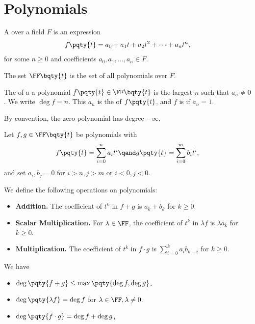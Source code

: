 \section{Polynomials}

\begin{definition}
    A  over a field \(F\) is an expression
    \[
        f\pqty{t} = a_0 + a_1 t + a_2 t^2 + \dots + a_n t^n,
    \]
    for some \(n \geq 0\) and coefficients \(a_0, a_1, \dots, a_n \in F\).

    The set \(\FF\bqty{t}\) is the set of all polynomials over \(F\).

    The  of a a polynomial \(f\pqty{t} \in \FF\bqty{t}\) is the largest \(n\) such that \(a_n \neq 0\). We write \(\deg f = n\). This \(a_n\) is the  of \(f\pqty{t}\), and \(f\) is  if \(a_n = 1\).

    By convention, the zero polynomial has degree \(-\infty\).
\end{definition}

\begin{definition}
    Let \(f, g \in \FF\bqty{t}\) be polynomials with
    \[
        f\pqty{t} = \sum_{i = 0}^{n} a_i t^i \qand g\pqty{t} = \sum_{ i =0}^{m} b_i t^i,
    \]
    and set \(a_i, b_j = 0\) for \(i > n, j > m\) or \(i < 0, j < 0\).
    
    We define the following operations on polynomials:
    \begin{itemize}
        \item \textbf{Addition.} The coefficient of \(t^k\) in \(f + g\) is \(a_k + b_k\) for \(k \geq 0\).
        \item \textbf{Scalar Multiplication.} For \(\lambda \in \FF\), the coefficient of \(t^k\) in \(\lambda f\) is \(\lambda a_k\) for \(k \geq 0\).
        \item \textbf{Multiplication.} The coefficient of \(t^k\) in \(f \cdot g\) is \(\sum_{i = 0}^{k} a_i b_{k - i}\) for \(k \geq 0\).
    \end{itemize}
\end{definition}

\begin{proposition}
    We have
    \begin{itemize}
        \item \(\deg \pqty{f + g} \leq \max\pqty{\deg f, \deg g}\).
        \item \(\deg \pqty{\lambda f} = \deg f\) for \(\lambda \in \FF, \lambda \neq 0\).
        \item \(\deg \pqty{f \cdot g} = \deg f + \deg g\),
    \end{itemize}
\end{proposition}


